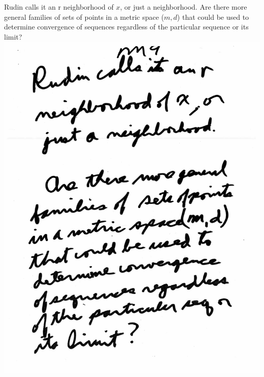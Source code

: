 \documentclass[10pt,a4paper]{article}
\begin{document}
{{\begin{flushleft}
Rudin calls it an r neighborhood of $x$, or just a neighborhood. Are there more general families of sets of points in a metric space ($m, d$) that could be used to determine convergence of sequences regardless of the particular sequence or its limit?
\includegraphics[scale=.5]{Pages/MS_9}
\newpage


\end{flushleft}}}
\end{document}
